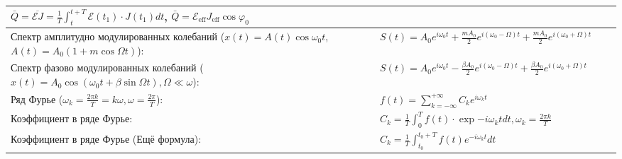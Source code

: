 \documentclass{article}
\begin{document}
\begin{tabular}{ |p{6cm}|p{3cm}|p{6cm}|p{3.5cm}|  }
$\bar{Q}=\overline{\mathcal{E} J}=\frac{1}{T} \int_{t}^{t+T} \mathcal{E}\left(t_{1}\right) \cdot J\left(t_{1}\right) d t$,
$\bar{Q}=\mathcal{E}_{\mathrm{eff}} J_{\mathrm{eff}} \cos \varphi_{0}$     &
                                                                           &
                                                                           \\
\hline
Спектр амплитудно модулированных колебаний ($x(t)=A(t) \cos \omega_{0} t$, $A(t)=A_{0}(1+m \cos \Omega t)$):&
$S(t)=A_{0} e^{i \omega_{0} t}+\frac{m A_{0}}{2} e^{i\left(\omega_{0}-\Omega\right) t}+\frac{m A_{0}}{2} e^{i\left(\omega_{0}+\Omega\right) t}$&
                                                                           &
                                                                           \\
\hline
Спектр фазово модулированных колебаний ($x(t)=A_{0} \cos \left(\omega_{0} t+\beta \sin \Omega t\right), \Omega \ll \omega$):&
$S(t)=A_{0} e^{i \omega_{0} t}-\frac{\beta A_{0}}{2} e^{i\left(\omega_{0}-\Omega\right) t}+\frac{\beta A_{0}}{2} e^{i\left(\omega_{0}+\Omega\right) t}$&
                                                                           &
                                                                           \\
\hline
Ряд Фурье ($\omega_{k}=\frac{2 \pi k}{T}=k \omega, \omega=\frac{2 \pi}{T}$):&
$f(t)=\sum_{k=-\infty}^{+\infty} C_{k} e^{i \omega_{k} t}$                 &
                                                                           &
                                                                           \\
\hline
Коэффициент в ряде Фурье:                                                  &
$C_{k}=\frac{1}{T} \int_{0}^{T} f(t) \cdot \exp{-i \omega_{k} t} d t, \omega_{k}=\frac{2 \pi k}{T}$&
                                                                           &
                                                                           \\
\hline
Коэффициент в ряде Фурье (Ещё формула):                                    &
$C_{k}=\frac{1}{T} \int_{t_{0}}^{t_{0}+T} f(t) e^{-i \omega_{k} t} d t$    &
                                                                           &
                                                                           \\
\hline
\end{tabular}
\end{document}
